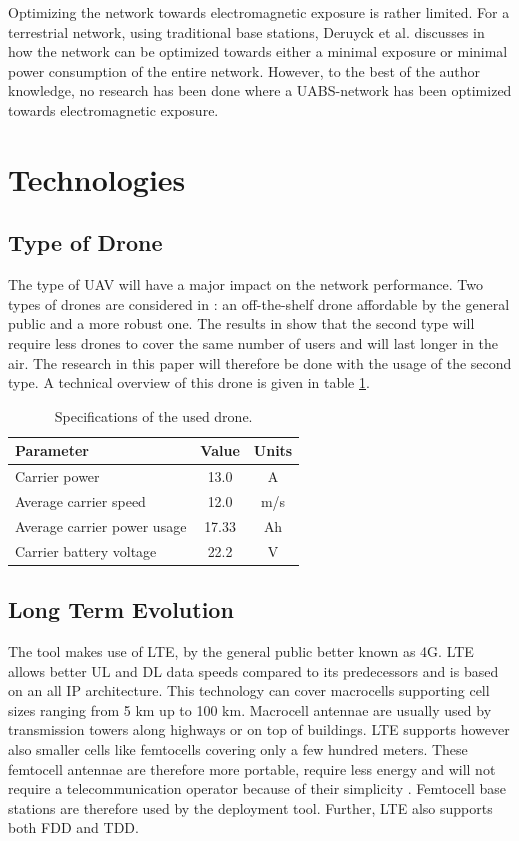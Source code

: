 Optimizing the network towards electromagnetic exposure is rather limited. For a terrestrial network, using traditional base stations,
Deruyck et al. discusses in \cite{J1} how the network can be optimized towards either a minimal exposure or minimal power consumption of the entire network.
However, to the best of the author knowledge, no research has been done where a \gls{UABS}-network has been optimized towards electromagnetic exposure.

\section{Technologies}
\subsection{Type of Drone}
\label{sec:typeofdrone}

The type of \gls{UAV} will have a major impact on the network performance.
Two types of 
drones are considered in \cite{J2}: an off-the-shelf drone affordable by the general public and a more robust one. The results in \cite{J2}
show that the second type will require less drones to cover the same number of users and will last longer in the air. The research in this paper
will therefore be done with the usage of the second type. A technical overview of this drone is given in table \ref{table:dronespecs}.

\begin{table}[h!]
\centering
\begin{tabular}{|l|c|c|}
\hline
 Parameter          & Value      & Units   \\    \hline
 Carrier power      & 13.0 &A \\
 Average carrier speed           & 12.0 &m/s       \\ 
 Average carrier power usage    & 17.33& Ah      \\ 
 Carrier battery voltage        & 22.2 &V \\ \hline
\end{tabular}
\caption{Specifications of the used drone.}
\label{table:dronespecs}
\end{table}

\subsection{Long Term Evolution}
The tool makes use of \gls{LTE}, by the general public better known as 4G.  \gls{LTE} allows better \gls{UL} and \gls{DL} data speeds 
compared to its predecessors and is based on an all IP architecture. This technology can cover macrocells supporting cell sizes ranging from 5 km up to 100 km. 
Macrocell antennae are usually used by transmission towers along highways or on top of buildings. LTE supports however also smaller cells like
femtocells covering only a few hundred meters. These femtocell antennae are therefore more portable, require less energy and will not require a telecommunication operator because
of their simplicity \cite{J34}. Femtocell base stations are therefore used by the deployment tool.
Further, \gls{LTE} also supports both \gls{FDD} and \gls{TDD}.

